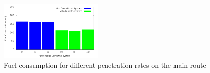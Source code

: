 \begin{figure}[htb]
\includegraphics[width=0.45\textwidth]{../images/tp0c1_0/combinedFuel.png}
\caption{Fuel consumption for different penetration rates on the main route}
\label{fig:TestResults:combinedFuel}
\end{figure}

